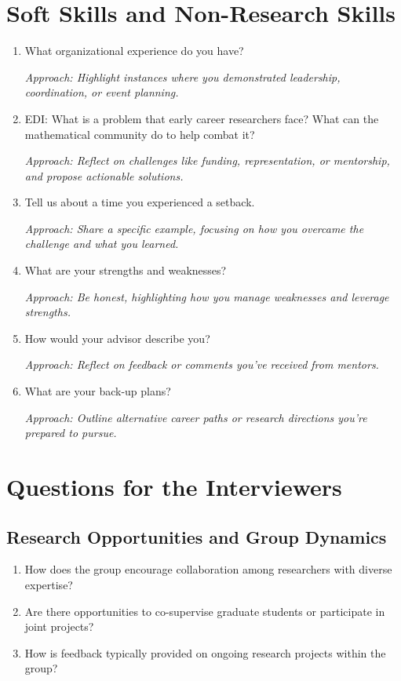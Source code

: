 \documentclass[12pt]{article}
\numberwithin{equation}{section}
\begin{document}
\section{Soft Skills and Non-Research Skills}
\begin{enumerate}
    \item What organizational experience do you have?
    
    \textit{Approach: Highlight instances where you demonstrated leadership, coordination, or event planning.}

    \item EDI: What is a problem that early career researchers face? What can the mathematical community do to help combat it?
    
    \textit{Approach: Reflect on challenges like funding, representation, or mentorship, and propose actionable solutions.}

    \item Tell us about a time you experienced a setback.
    
    \textit{Approach: Share a specific example, focusing on how you overcame the challenge and what you learned.}

    \item What are your strengths and weaknesses?
    
    \textit{Approach: Be honest, highlighting how you manage weaknesses and leverage strengths.}

    \item How would your advisor describe you?
    
    \textit{Approach: Reflect on feedback or comments you’ve received from mentors.}

    \item What are your back-up plans?
    
    \textit{Approach: Outline alternative career paths or research directions you’re prepared to pursue.}
\end{enumerate}

\section{Questions for the Interviewers}
\subsection{Research Opportunities and Group Dynamics}
\begin{enumerate}
    \item How does the group encourage collaboration among researchers with diverse expertise?

    \item Are there opportunities to co-supervise graduate students or participate in joint projects?

    \item How is feedback typically provided on ongoing research projects within the group?
\end{enumerate}
\end{document}
